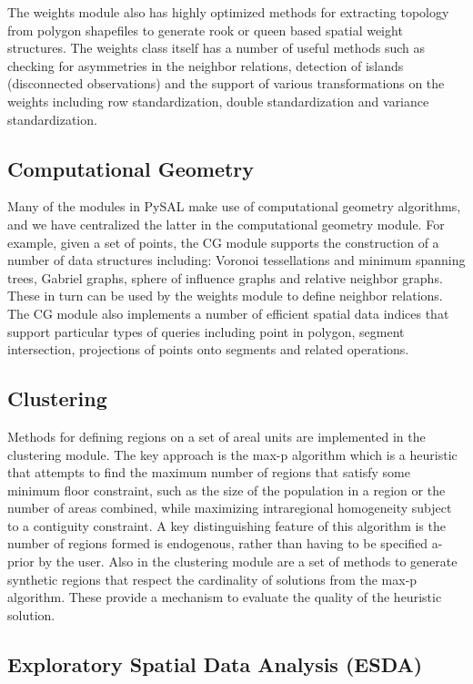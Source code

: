 \documentclass[11pt, titlepage]{article}
\begin{document}
The weights module also has highly optimized methods for extracting
topology from polygon shapefiles to generate rook or queen based spatial
weight structures. The weights class itself has a number of useful
methods such as checking for asymmetries in the neighbor relations,
detection of islands (disconnected observations) and the support of
various transformations on the weights including row standardization,
double standardization and variance standardization.

\subsection{Computational Geometry}

Many of the modules in PySAL make use of computational geometry
algorithms, and we have centralized the latter in the computational
geometry module. For example, given a set of points, the CG module
supports the construction of a number of data structures including:
Voronoi tessellations and minimum spanning trees, Gabriel graphs, sphere
of influence graphs and relative neighbor graphs. These in turn can be
used by the weights module to define neighbor relations. The CG module
also implements a number of efficient spatial data indices that support
particular types of queries including point in polygon, segment
intersection, projections of points onto segments and related
operations.

\subsection{Clustering}

Methods for defining regions on a set of areal units are implemented in
the clustering module. The key approach is the max-p algorithm \citep{duque2012max}  which is
a heuristic that attempts to find the maximum number of regions that
satisfy some minimum floor constraint, such as the size of the
population in a region or the number of areas combined, while maximizing
intraregional homogeneity subject to a contiguity constraint. A key
distinguishing feature of this algorithm is the  number of regions
formed is endogenous, rather than having to be specified a-prior by the
user. Also in the clustering module are a set of methods to generate
synthetic regions that respect the cardinality of solutions from the
max-p algorithm. These provide a mechanism to evaluate the quality of
the heuristic solution.

\subsection{Exploratory Spatial Data Analysis (ESDA)}
\end{document}
